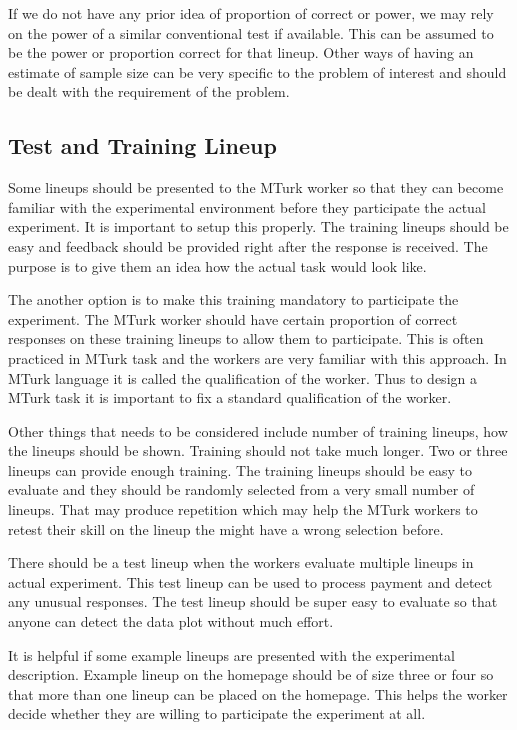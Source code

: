 \documentclass[11pt]{article}
\begin{document}
If we do not have any prior idea of proportion of correct or power, we may rely on the power of a similar conventional test if available. This can be assumed to be the power or proportion correct for that lineup. Other ways of having an estimate of sample size can be very specific to the problem of interest and should be dealt with the requirement of the problem.

\subsection{Test and Training Lineup} Some lineups should be presented to the MTurk worker so that they can become familiar with the experimental environment before they participate the actual experiment. It is important to setup this properly. The training lineups should be easy and feedback should be provided right after the response is received. The purpose is to give them an idea how the actual task would look like. 

The another option is to make this training mandatory to participate the experiment. The MTurk worker should have certain proportion of correct responses on these training lineups to allow them to participate. This is often practiced in MTurk task and the workers are very familiar with this approach. In MTurk language it is called the qualification of the worker. Thus to design a MTurk task it is important to fix a standard qualification of the worker.

Other things that needs to be considered include number of training lineups, how the lineups should be shown. Training should not take much longer. Two or three lineups can provide enough training. The training lineups should be easy to evaluate and they should be randomly selected from a very small number of lineups. That may produce repetition which may help the MTurk workers to retest their skill on the lineup the might have a wrong selection before. 

There should be a test lineup when the workers evaluate multiple lineups in actual experiment. This test lineup can be used to process payment and detect any unusual responses. The test lineup should be super easy to evaluate so that anyone can detect the data plot without much effort.

It is helpful if some example lineups are presented with the experimental description. Example lineup on the homepage should be of size three or four so that more than one lineup can be placed on the homepage. This helps the worker decide whether they are willing to participate the experiment at all.
\end{document}
